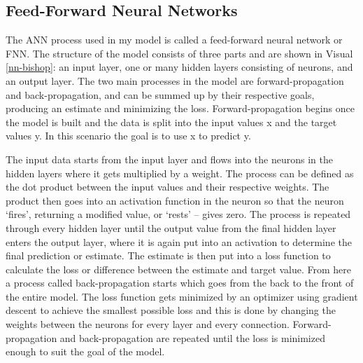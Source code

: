 \documentclass[12pt]{article}
\begin{document}
        \subsection{Feed-Forward Neural Networks}

            The ANN process used in my model is called a feed-forward neural network or FNN. 
            The structure of the model consists of three parts and are shown in Visual \ref{nn-bishop}: 
            an input layer, one or many hidden layers consisting of neurons, and an output layer. 
            The two main processes in the model are forward-propagation and back-propagation, 
            and can be summed up by their respective goals, producing an estimate and minimizing the loss. 
            Forward-propagation begins once the model is built and the data is split into the input values x and the target values y. 
            In this scenario the goal is to use x to predict y.  

            The input data starts from the input layer and flows into the neurons in the hidden layers where it gets multiplied by a weight. 
            The process can be defined as the dot product between the input values and their respective weights. 
            The product then goes into an activation function in the neuron 
            so that the neuron ‘fires’, returning a modified value, or ‘rests’ -- gives zero. 
            The process is repeated through every hidden layer until the output value from the final hidden layer enters the output layer, 
            where it is again put into an activation to determine the final prediction or estimate. 
            The estimate is then put into a loss function to calculate the loss or difference between the estimate and target value. 
            From here a process called back-propagation starts which goes from the back to the front of the entire model. 
            The loss function gets minimized by an optimizer using gradient descent to achieve the smallest possible loss 
            and this is done by changing the weights between the neurons for every layer and every connection. 
            Forward-propagation and back-propagation are repeated until the loss is minimized enough to suit the goal of the model.
        
\end{document}
